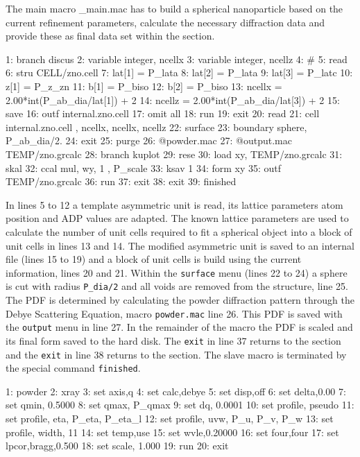 The main \Discus macro {\discus\_main.mac} has to build a spherical 
nanoparticle based on the current refinement parameters, calculate the
necessary diffraction data and provide these as final data set within the 
\Kuplot section.

\begin{MacVerbatim}
 1: branch discus
 2: variable integer, ncellx
 3: variable integer, ncellz
 4: #
 5: read
 6:   stru CELL/zno.cell
 7: lat[1] = P_lata
 8: lat[2] = P_lata
 9: lat[3] = P_latc
10: z[1]   = P_z_zn
11: b[1]   = P_biso
12: b[2]   = P_biso
13: ncellx = 2.00*int(P_ab_dia/lat[1]) + 2
14: ncellz = 2.00*int(P_ab_dia/lat[3]) + 2
15: save
16:   outf internal.zno.cell
17:   omit all
18:   run
19: exit
20: read
21:   cell internal.zno.cell     , ncellx, ncellx, ncellz
22: surface
23:   boundary sphere, P_ab_dia/2.
24: exit
25: purge
26: @powder.mac
27: @output.mac TEMP/zno.grcalc
28: branch kuplot
29: rese
30: load xy, TEMP/zno.grcalc
31: skal
32: ccal mul, wy, 1 , P_scale
33: ksav 1
34:   form xy
35:   outf   TEMP/zno.grcalc
36:   run
37: exit
38: exit
39: finished
\end{MacVerbatim}

In lines 5 to 12 a template asymmetric unit is read, its lattice parameters
atom position and ADP values are adapted. The known lattice parameters
are used to calculate the number of unit cells required to fit a spherical 
object into a block of unit cells in lines 13 and 14. The modified 
asymmetric unit is saved to an internal file (lines 15 to 19) and a block of
unit cells is build using the current information, lines 20 and 21. Within the
{\tt surface} menu (lines 22 to 24) a sphere is cut with radius {\tt P\_dia/2} 
and all voids are removed from the structure, line 25. The PDF is determined
by calculating the powder diffraction pattern through the Debye Scattering 
Equation, macro {\tt powder.mac} line 26. This PDF is saved with the 
{\tt output} menu in line 27. In the remainder of the macro the PDF is scaled
and its final form saved to the hard disk. The {\tt exit} in line 37 returns to
the \Discus section and the {\tt exit} in line 38 returns to the \Refine 
section. The slave macro is terminated by the special \Refine command
{\tt finished}.

\begin{MacVerbatim}
 1: powder
 2: xray
 3: set axis,q
 4: set calc,debye
 5: set disp,off
 6: set delta,0.00
 7: set qmin, 0.5000
 8: set qmax, P_qmax
 9: set dq,   0.0001
10: set profile, pseudo
11: set profile, eta, P_eta, P_eta_l
12: set profile, uvw, P_u, P_v, P_w
13: set profile,  width, 11
14: set temp,use
15: set wvle,0.20000
16: set four,four
17: set lpcor,bragg,0.500
18: set scale, 1.000  
19: run
20: exit
\end{MacVerbatim}

